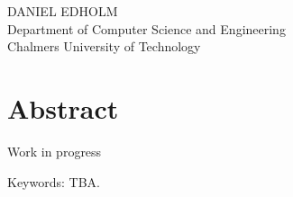 \THETITLE\\
\TITLEDESCR\\
DANIEL EDHOLM\\
Department of Computer Science and Engineering\\
Chalmers University of Technology\\

\thispagestyle{plain}			%
\section*{Abstract}
Work in progress

\vfill
Keywords: TBA.

\newpage				%
\thispagestyle{empty}
\mbox{}